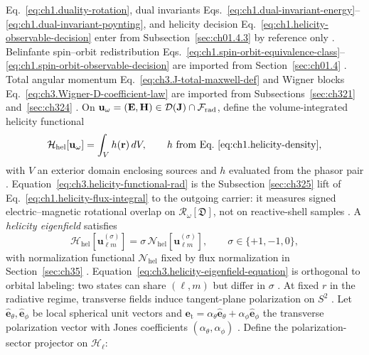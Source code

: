 Eq.~\eqref{eq:ch1.duality-rotation}, dual invariants
Eqs.~\eqref{eq:ch1.dual-invariant-energy}--\eqref{eq:ch1.dual-invariant-poynting}, and helicity decision
Eq.~\eqref{eq:ch1.helicity-observable-decision} enter from Subsection~\ref{sec:ch01.4.3} by reference only
\cite{stratton1941}. Belinfante spin--orbit redistribution
Eqs.~\eqref{eq:ch1.spin-orbit-equivalence-class}--\eqref{eq:ch1.spin-orbit-observable-decision} are imported
from Section~\ref{sec:ch01.4} \cite{belinfante1940}. Total angular momentum
Eq.~\eqref{eq:ch3.J-total-maxwell-def} and Wigner blocks Eq.~\eqref{eq:ch3.Wigner-D-coefficient-law} are
imported from Subsections~\ref{sec:ch321} and~\ref{sec:ch324} \cite{jackson1999}.
On \(\mathbf{u}_\omega=(\mathbf{E},\mathbf{H})\in\mathcal{D}(\mathbf{J})\cap\mathcal{F}_{\mathrm{rad}}\), define the
volume-integrated helicity functional
\begin{equation}
\label{eq:ch3.helicity-functional-rad}
\mathcal{H}_{\mathrm{hel}}[\mathbf{u}_\omega]
=
\int_{V}
h(\mathbf{r})\,dV,
\qquad
h\ \text{from Eq.~\eqref{eq:ch1.helicity-density}},
\end{equation}
with \(V\) an exterior domain enclosing sources and \(h\) evaluated from the phasor pair
\cite{stratton1941}. Equation~\eqref{eq:ch3.helicity-functional-rad} is the Subsection
\ref{sec:ch325} lift of Eq.~\eqref{eq:ch1.helicity-flux-integral} to the outgoing carrier: it measures
signed electric--magnetic rotational overlap on \(\mathcal{R}_\omega[\mathfrak{D}]\), not on reactive-shell
samples \cite{stratton1941}. A \emph{helicity eigenfield} satisfies
\begin{equation}
\label{eq:ch3.helicity-eigenfield-equation}
\mathcal{H}_{\mathrm{hel}}[\mathbf{u}_{\ell m}^{(\sigma)}]
=
\sigma\,\mathcal{N}_{\mathrm{hel}}[\mathbf{u}_{\ell m}^{(\sigma)}],
\qquad
\sigma\in\{+1,-1,0\},
\end{equation}
with normalization functional \(\mathcal{N}_{\mathrm{hel}}\) fixed by flux normalization in
Section~\ref{sec:ch35} \cite{hansen1988}. Equation~\eqref{eq:ch3.helicity-eigenfield-equation} is
orthogonal to orbital labeling: two states can share \((\ell,m)\) but differ in \(\sigma\)
\cite{jackson1999}.
At fixed \(r\) in the radiative regime, transverse fields induce tangent-plane polarization on
\(S^{2}\) \cite{stratton1941}. Let \(\hat{\mathbf{e}}_\theta,\hat{\mathbf{e}}_\phi\) be local
spherical unit vectors and \(\mathbf{e}_{\mathrm{t}}=\alpha_\theta\hat{\mathbf{e}}_\theta+\alpha_\phi\hat{\mathbf{e}}_\phi\)
the transverse polarization vector with Jones coefficients \((\alpha_\theta,\alpha_\phi)\)
\cite{stratton1941}. Define the polarization-sector projector on \(\mathcal{H}_\ell\):
